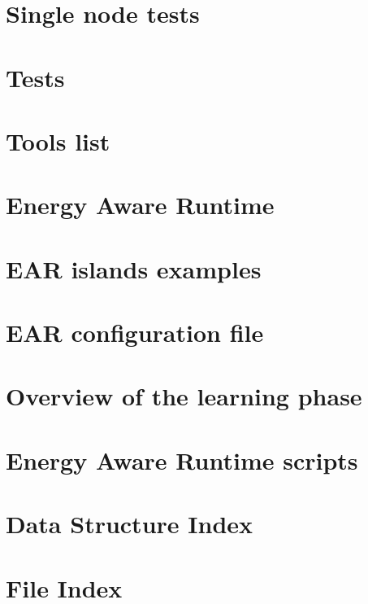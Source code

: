 \documentclass[twoside]{book}
\newcommand{\+}{\discretionary{\mbox{\scriptsize$\hookleftarrow$}}{}{}}
\begin{document}
\chapter{Single node tests}
\label{md_src_tests_plugin_single_node_README}
\hypertarget{md_src_tests_plugin_single_node_README}{}

\chapter{Tests}
\label{md_src_tests_README}
\hypertarget{md_src_tests_README}{}

\chapter{Tools list}
\label{md_src_tools_README}
\hypertarget{md_src_tools_README}{}

\chapter{Energy Aware Runtime}
\label{md_README}
\hypertarget{md_README}{}

\chapter{E\+AR islands examples}
\label{md_etc_conf_README.islands}
\hypertarget{md_etc_conf_README.islands}{}

\chapter{E\+AR configuration file}
\label{md_etc_conf_README}
\hypertarget{md_etc_conf_README}{}

\chapter{Overview of the learning phase}
\label{md_etc_scripts_learning_README}
\hypertarget{md_etc_scripts_learning_README}{}

\chapter{Energy Aware Runtime scripts}
\label{md_etc_scripts_README}
\hypertarget{md_etc_scripts_README}{}

\chapter{Data Structure Index}

\chapter{File Index}

\end{document}
